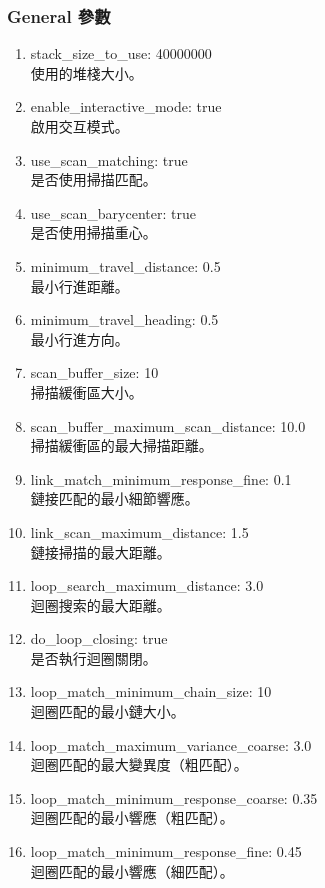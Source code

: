 \subsubsection{General 參數}
\begin{enumerate}
    \item stack\_size\_to\_use: 40000000
    \\使用的堆棧大小。
    \item enable\_interactive\_mode: true
    \\啟用交互模式。
    \item use\_scan\_matching: true
    \\是否使用掃描匹配。
    \item use\_scan\_barycenter: true
    \\是否使用掃描重心。
    \item minimum\_travel\_distance: 0.5
    \\最小行進距離。
    \item minimum\_travel\_heading: 0.5
    \\最小行進方向。
    \item scan\_buffer\_size: 10
    \\掃描緩衝區大小。
    \item scan\_buffer\_maximum\_scan\_distance: 10.0
    \\掃描緩衝區的最大掃描距離。
    \item link\_match\_minimum\_response\_fine: 0.1
    \\鏈接匹配的最小細節響應。
    \item link\_scan\_maximum\_distance: 1.5
    \\鏈接掃描的最大距離。
    \item loop\_search\_maximum\_distance: 3.0
    \\迴圈搜索的最大距離。
    \item do\_loop\_closing: true
    \\是否執行迴圈關閉。
    \item loop\_match\_minimum\_chain\_size: 10
    \\迴圈匹配的最小鏈大小。
    \item loop\_match\_maximum\_variance\_coarse: 3.0
    \\迴圈匹配的最大變異度（粗匹配）。
    \item loop\_match\_minimum\_response\_coarse: 0.35
    \\迴圈匹配的最小響應（粗匹配）。
    \item loop\_match\_minimum\_response\_fine: 0.45
    \\迴圈匹配的最小響應（細匹配）。
\end{enumerate}
